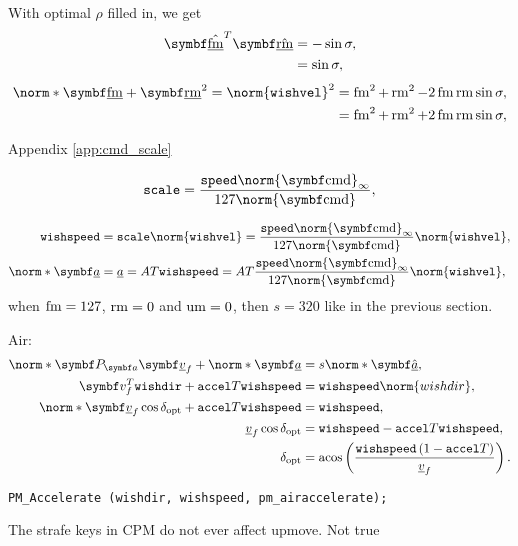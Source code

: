 With optimal $\rho$ filled in, we get
\begin{align*}
\uvec{\flat{\fmove}}^T \uvec{\flat{\rmove}} &= -\sin\sigma,\\
&= \sin\sigma,
\end{align*}
\begin{align*}
\norm*{\vec{\flat{\fmove}} + \vec{\flat{\rmove}}}^2 = \norm{\texttt{wishvel}}^2 &= \fmove^2 + \rmove^2 - 2\fmove\rmove\sin\sigma,\\
&= \fmove^2 + \rmove^2 + 2\fmove\rmove\sin\sigma,
\end{align*}

Appendix \ref{app:cmd_scale}

\begin{align*}
\texttt{scale} = \frac{\texttt{speed}\norm{\vec{\cmd}}_{\infty}}{127\norm{\vec{\cmd}}},
\end{align*}

\begin{align*}
\texttt{wishspeed} &= \texttt{scale} \norm{\texttt{wishvel}} =
\frac{\texttt{speed}\norm{\vec{\cmd}}_{\infty}}{127\norm{\vec{\cmd}}} \norm{\texttt{wishvel}},\\
\norm*{\vec{\flat{a}}} &= \flat{a} = AT \texttt{wishspeed} = AT\frac{\texttt{speed}\norm{\vec{\cmd}}_{\infty}}{127\norm{\vec{\cmd}}} \norm{\texttt{wishvel}},
\end{align*}
when $\operatorname{fm} = 127$, $\operatorname{rm} = 0$ and $\operatorname{um} = 0$, then $s = 320$ like in the previous section.

Air:
\begin{align}
\nonumber
\norm*{\projmat{a} \vec{\flat{v}}_f} + \norm*{\vec{\flat{a}}} &= s \norm*{\uvec{\flat{a}}},\\
\nonumber
\vec{v}_{f}^T\texttt{wishdir} + \texttt{accel}T\texttt{wishspeed} &= \texttt{wishspeed}\norm{wishdir},\\
\nonumber
\norm*{\vec{\flat{v}}_f} \cos{\delta_{\opt}} + \texttt{accel}T\texttt{wishspeed} &= \texttt{wishspeed},\\
\nonumber
\flat{v}_f \cos{\delta_{\opt}} &= \texttt{wishspeed} - \texttt{accel}T\texttt{wishspeed},\\
\delta_{\opt} &= \acos\left( \frac{\texttt{wishspeed} \left(1 - \texttt{accel}T\right)}{\flat{v}_f} \right).
\end{align}

\texttt{PM\_Accelerate (wishdir, wishspeed, pm\_airaccelerate);}

The strafe keys in CPM do not ever affect upmove. Not true


